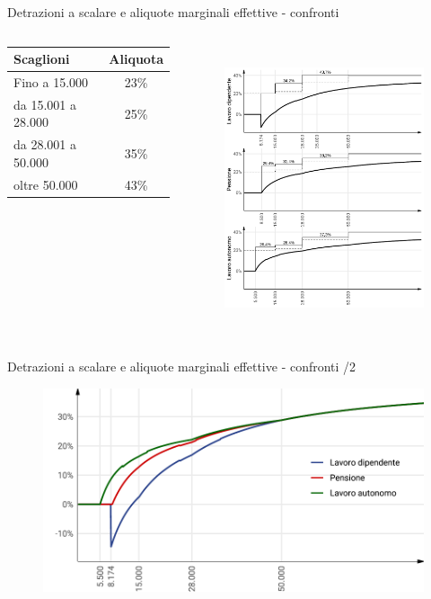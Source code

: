 \documentclass[11pt]{beamer}
\newcommand\€{\,\text{€}}
\begin{document}
\begin{frame}{Detrazioni a scalare e aliquote marginali effettive - confronti}
\begin{columns}
\begin{column}{.33\columnwidth}
\scriptsize
\begin{tabular}{lc}
  \toprule
  Scaglioni & Aliquota\\
  \midrule
  Fino a 15.000\€ &23\%\\
  da 15.001 a 28.000\€ &25\%\\
  da 28.001 a 50.000\€ &35\%\\
  oltre 50.000\€ &43\%\\
  \bottomrule                                                       
\end{tabular}
\end{column}

\begin{column}{.66\columnwidth}
\vspace*{-5mm}
\begin{figure}
\centering
\includegraphics[height=8.3cm]{./figure/aliquote-medie-marginali-2022.pdf}
\end{figure}
\end{column}
\end{columns}
\end{frame}


\begin{frame}{Detrazioni a scalare e aliquote marginali effettive - confronti /2}
\begin{figure}
\centering
\includegraphics[height=6cm]{./figure/aliquote-medie-2022-color.pdf}
\end{figure}
\end{frame}
\end{document}
